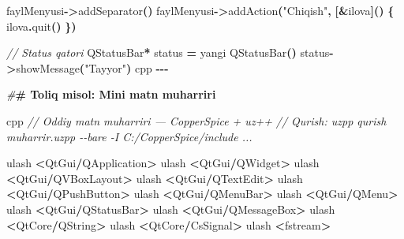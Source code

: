 \documentclass[a4paper,11pt,twoside,openright]{book}
\newenvironment{Shaded}{\begin{snugshade}}{\end{snugshade}}
\newcommand{\CommentTok}[1]{\textcolor[rgb]{0.56,0.35,0.01}{\textit{#1}}}
\newcommand{\ErrorTok}[1]{\textcolor[rgb]{0.64,0.00,0.00}{\textbf{#1}}}
\newcommand{\ExtensionTok}[1]{#1}
\newcommand{\NormalTok}[1]{#1}
\newcommand{\OperatorTok}[1]{\textcolor[rgb]{0.81,0.36,0.00}{\textbf{#1}}}
\newcommand{\PreprocessorTok}[1]{\textcolor[rgb]{0.56,0.35,0.01}{\textit{#1}}}
\newcommand{\StringTok}[1]{\textcolor[rgb]{0.31,0.60,0.02}{#1}}
\begin{document}
\begin{Shaded}
\begin{Highlighting}[]
\NormalTok{faylMenyusi}\OperatorTok{{-}\textgreater{}}\NormalTok{addSeparator}\OperatorTok{()}
\NormalTok{faylMenyusi}\OperatorTok{{-}\textgreater{}}\NormalTok{addAction}\OperatorTok{(}\StringTok{"Chiqish"}\OperatorTok{,} \OperatorTok{[\&}\NormalTok{ilova}\OperatorTok{]()} \OperatorTok{\{}
\NormalTok{    ilova}\OperatorTok{.}\NormalTok{quit}\OperatorTok{()}
\OperatorTok{\})}

\CommentTok{// Status qatori}
\ExtensionTok{QStatusBar}\OperatorTok{*}\NormalTok{ status }\OperatorTok{=}\NormalTok{ yangi }\ExtensionTok{QStatusBar}\OperatorTok{()}
\NormalTok{status}\OperatorTok{{-}\textgreater{}}\NormalTok{showMessage}\OperatorTok{(}\StringTok{"Tayyor"}\OperatorTok{)}
\ErrorTok{\textasciigrave{}\textasciigrave{}\textasciigrave{}}\NormalTok{cpp}
\OperatorTok{{-}{-}{-}}

\PreprocessorTok{\#}\ErrorTok{\# To\textquotesingle{}liq misol: Mini matn muharriri}

\ErrorTok{\textasciigrave{}\textasciigrave{}\textasciigrave{}}\NormalTok{cpp}
\CommentTok{// Oddiy matn muharriri — CopperSpice + uz++}
\CommentTok{// Qurish: uzpp qurish muharrir.uzpp {-}{-}bare {-}I C:/CopperSpice/include ...}

\NormalTok{ulash }\OperatorTok{\textless{}}\NormalTok{QtGui}\OperatorTok{/}\ExtensionTok{QApplication}\OperatorTok{\textgreater{}}
\NormalTok{ulash }\OperatorTok{\textless{}}\NormalTok{QtGui}\OperatorTok{/}\ExtensionTok{QWidget}\OperatorTok{\textgreater{}}
\NormalTok{ulash }\OperatorTok{\textless{}}\NormalTok{QtGui}\OperatorTok{/}\ExtensionTok{QVBoxLayout}\OperatorTok{\textgreater{}}
\NormalTok{ulash }\OperatorTok{\textless{}}\NormalTok{QtGui}\OperatorTok{/}\ExtensionTok{QTextEdit}\OperatorTok{\textgreater{}}
\NormalTok{ulash }\OperatorTok{\textless{}}\NormalTok{QtGui}\OperatorTok{/}\ExtensionTok{QPushButton}\OperatorTok{\textgreater{}}
\NormalTok{ulash }\OperatorTok{\textless{}}\NormalTok{QtGui}\OperatorTok{/}\ExtensionTok{QMenuBar}\OperatorTok{\textgreater{}}
\NormalTok{ulash }\OperatorTok{\textless{}}\NormalTok{QtGui}\OperatorTok{/}\ExtensionTok{QMenu}\OperatorTok{\textgreater{}}
\NormalTok{ulash }\OperatorTok{\textless{}}\NormalTok{QtGui}\OperatorTok{/}\ExtensionTok{QStatusBar}\OperatorTok{\textgreater{}}
\NormalTok{ulash }\OperatorTok{\textless{}}\NormalTok{QtGui}\OperatorTok{/}\ExtensionTok{QMessageBox}\OperatorTok{\textgreater{}}
\NormalTok{ulash }\OperatorTok{\textless{}}\NormalTok{QtCore}\OperatorTok{/}\ExtensionTok{QString}\OperatorTok{\textgreater{}}
\NormalTok{ulash }\OperatorTok{\textless{}}\NormalTok{QtCore}\OperatorTok{/}\NormalTok{CsSignal}\OperatorTok{\textgreater{}}
\NormalTok{ulash }\OperatorTok{\textless{}}\NormalTok{fstream}\OperatorTok{\textgreater{}}


\end{Highlighting}
\end{Shaded}
\end{document}

